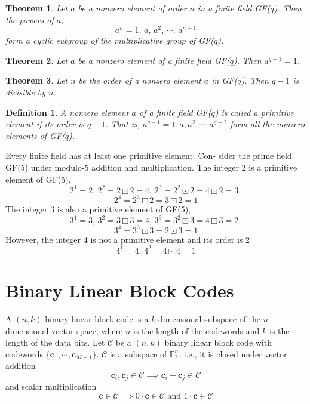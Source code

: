 \documentclass[11pt]{article}
\newtheorem{theorem}{Theorem}
\newtheorem{definition}{Definition}
\begin{document}
\begin{theorem}
Let $a$ be a nonzero element of order $n$ in a finite field GF($q$). Then the powers of $a$,
\[
a^n = 1, \, a, \, a^2, \, \cdots, \, a^{n-1}
\]
form a cyclic subgroup of the multiplicative group of GF($q$).
\end{theorem}

\begin{theorem}
Let $a$ be a nonzero element of a finite field GF($q$). Then $a^{q-1} =1$. 
\end{theorem}

\begin{theorem}
Let $n$ be the order of a nonzero element $a$ in GF($q$). Then $q-1$ is divisible by $n$.
\end{theorem}

\begin{definition}
A nonzero element $a$ of a finite field GF($q$) is called a primitive element if its order is $q - 1$. That is, $a^{q-1} = 1, a, a^2, \cdots,a^{q-2}$ form all the nonzero elements of GF($q$).
\end{definition}

Every finite field has at least one primitive element. Con- sider the prime field GF(5) under modulo-5 addition and multiplication.
The integer 2 is a primitive element of GF(5),
\[
2^1 = 2, \, 2^2 = 2 \boxdot 2 = 4, \, 2^3 = 2^2 \boxdot 2 = 4 \boxdot 2 = 3,
\]
\[
2^4 = 2^3 \boxdot 2 = 3 \boxdot 2 = 1
\]
The integer 3 is also a primitive element of GF(5),
\[
3^1 = 3, \, 3^2 = 3 \boxdot 3 = 4, \, 3^3 = 3^2 \boxdot 3 = 4 \boxdot 3 = 2,
\]
\[
3^4 = 3^3 \boxdot 3 = 2 \boxdot 3 = 1
\]
However, the integer 4 is not a primitive element and its order is 2
\[
4^1 = 4, \, 4^2 = 4 \boxdot 4 = 1
\]



\clearpage
\section{Binary Linear Block Codes}
A $(n,k)$ binary linear block code is a $k$-dimensional subspace of the $n$-dimensional vector space, where $n$ is the length of the codewords and $k$ is the length of the data bits. Let $\mathcal{C}$ be a $(n,k)$ binary linear block code with codewords $\{ \boldsymbol{c}_1, \cdots, \boldsymbol{c}_{M-1} \}$. $\mathcal{C}$ is a subspace of $\mathbb{F}_2^n$, i.e., it is closed under vector addition 
\[
\boldsymbol{c}_i, \boldsymbol{c}_j \in \mathcal{C} \implies \boldsymbol{c}_i + \boldsymbol{c}_j \in \mathcal{C}
\]
and scalar multiplication
\[
\boldsymbol{c} \in \mathcal{C} \implies 0 \cdot \boldsymbol{c} \in \mathcal{C} \text{ and } 1 \cdot \boldsymbol{c} \in \mathcal{C}
\]
\end{document}
